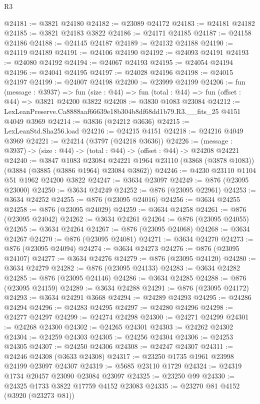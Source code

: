 \begin{lexlean}{R3}
\begin{coremodule}
@24181 := @3821 @24180
@24182 := @23089 @24172
@24183 := @24181 @24182
@24185 := @3821 @24183 @3822
@24186 := @24171 @24185
@24187 := @24158 @24186
@24188 := @24145 @24187
@24189 := @24132 @24188
@24190 := @24119 @24189
@24191 := @24106 @24190
@24192 := @24093 @24191
@24193 := @24080 @24192
@24194 := @24067 @24193
@24195 := @24054 @24194
@24196 := @24041 @24195
@24197 := @24028 @24196
@24198 := @24015 @24197
@24199 := @24007 @24198
@24200 := @23999 @24199
@24206 := fun (message : @3937) =>
  fun (size : @44) => fun (total : @44) => fun (offset : @44) => @3821 @24200 @3822
@24208 := @3830 @1083 @23084
@24212 := LexLeanPreserve.Ca8888aaf66639e18b304b8df68dd1b79.R3.__fits_25 @4151 @4049 @3969
@24214 := @3836 (@24212 @3636)
@24215 := LexLeanStd.Sha256.load
@24216 := @24215 @4151
@24218 := @24216 @4049 @3969
@24221 := @24214 (@3797 (@24218 @3636))
@24226 := (message : @3937) -> (size : @44) -> (total : @44) -> (offset : @44) -> @24208 @24221
@24240 := @3847
    @1083
    @23084
    @24221
    @1964
    @23110
    (@3868 (@3878 @1083))
    (@3884 (@3885 (@3886 @1964) @23084 @3862))
@24246 := @4230 @23110 @1104 @51 @1962 @24200 @3822
@24247 := @3634 @23097
@24249 := @876 (@23095 @23000)
@24250 := @3634 @24249
@24252 := @876 (@23095 @22961)
@24253 := @3634 @24252
@24255 := @876 (@23095 @24016)
@24256 := @3634 @24255
@24258 := @876 (@23095 @24029)
@24259 := @3634 @24258
@24261 := @876 (@23095 @24042)
@24262 := @3634 @24261
@24264 := @876 (@23095 @24055)
@24265 := @3634 @24264
@24267 := @876 (@23095 @24068)
@24268 := @3634 @24267
@24270 := @876 (@23095 @24081)
@24271 := @3634 @24270
@24273 := @876 (@23095 @24094)
@24274 := @3634 @24273
@24276 := @876 (@23095 @24107)
@24277 := @3634 @24276
@24279 := @876 (@23095 @24120)
@24280 := @3634 @24279
@24282 := @876 (@23095 @24133)
@24283 := @3634 @24282
@24285 := @876 (@23095 @24146)
@24286 := @3634 @24285
@24288 := @876 (@23095 @24159)
@24289 := @3634 @24288
@24291 := @876 (@23095 @24172)
@24293 := @3634 @24291 @3668
@24294 := @24289 @24293
@24295 := @24286 @24294
@24296 := @24283 @24295
@24297 := @24280 @24296
@24298 := @24277 @24297
@24299 := @24274 @24298
@24300 := @24271 @24299
@24301 := @24268 @24300
@24302 := @24265 @24301
@24303 := @24262 @24302
@24304 := @24259 @24303
@24305 := @24256 @24304
@24306 := @24253 @24305
@24307 := @24250 @24306
@24308 := @24247 @24307
@24311 := @24246 @24308 (@3633 @24308)
@24317 := @23250 @1735 @1961 @23998 @24199 @23097 @24307
@24319 := @5685 @23110 @1729
@24324 := @24319 @1734 @20457 @23090 @23084 @23097
@24325 := @23250 @99
@24330 := @24325 @1733 @3822 @17759 @4152 @23083
@24335 := @23270 @81 @4152 (@3920 (@23273 @81))

\end{coremodule}
\end{lexlean}
